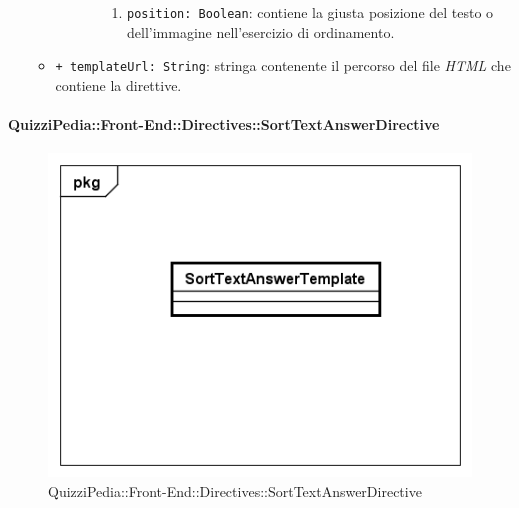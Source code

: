 \begin{itemize}
\begin{itemize}
\begin{itemize}
\begin{itemize}
						\begin{enumerate}
							\item \texttt{position: Boolean}: contiene la giusta posizione del testo o dell'immagine nell'esercizio di ordinamento.
						\end{enumerate}
					\end{itemize}
				\end{itemize}
				\item \texttt{+ templateUrl: String}: stringa contenente il percorso del file \textit{HTML} che contiene la direttive.
			\end{itemize}
		\end{itemize}
		
		\paragraph{QuizziPedia::Front-End::Directives::SortTextAnswerDirective}
		
		\label{QuizziPedia::Front-End::Directives::SortTextAnswerDirective}
		
		\begin{figure}[ht]
			\centering
			\includegraphics[scale=0.5,keepaspectratio]{UML/Classi/Front-End/QuizziPedia_Front-end_Templates_SortTextAnswerTemplate.png}
			\caption{QuizziPedia::Front-End::Directives::SortTextAnswerDirective}
		\end{figure} \FloatBarrier
		
